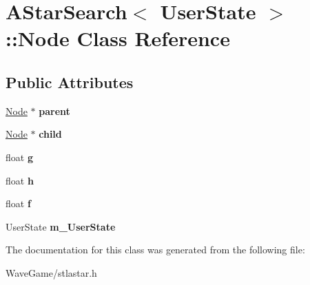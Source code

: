 \hypertarget{class_a_star_search_1_1_node}{}\section{A\+Star\+Search$<$ User\+State $>$\+:\+:Node Class Reference}
\label{class_a_star_search_1_1_node}
\subsection*{Public Attributes}
\begin{DoxyCompactItemize}
\item 
\mbox{\label{class_a_star_search_1_1_node_a3b9f178bbf2015dc60c10456a9cff217}} 
\hyperlink{class_a_star_search_1_1_node}{Node} $\ast$ {\bfseries parent}
\item 
\mbox{\label{class_a_star_search_1_1_node_ac005cb842f91af00d0f9bcf082784354}} 
\hyperlink{class_a_star_search_1_1_node}{Node} $\ast$ {\bfseries child}
\item 
\mbox{\label{class_a_star_search_1_1_node_a0e28aec09d5a00accb3e4c1c2d456621}} 
float {\bfseries g}
\item 
\mbox{\label{class_a_star_search_1_1_node_ac0a5ba6fe1671bd9009bb5a01264daa6}} 
float {\bfseries h}
\item 
\mbox{\label{class_a_star_search_1_1_node_afe1ddc41957c6f82e37403e0ae6adf41}} 
float {\bfseries f}
\item 
\mbox{\label{class_a_star_search_1_1_node_ab12ce605b590486e6a08b3cc3b074a00}} 
User\+State {\bfseries m\+\_\+\+User\+State}
\end{DoxyCompactItemize}


The documentation for this class was generated from the following file\+:\begin{DoxyCompactItemize}
\item 
Wave\+Game/stlastar.\+h\end{DoxyCompactItemize}
